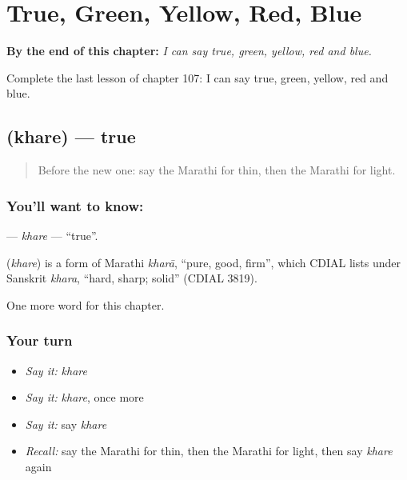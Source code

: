 
\chapter{True, Green, Yellow, Red, Blue}
\label{ch:mr-true-green-yellow-red-blue}

\begin{chapteropening}
\textbf{By the end of this chapter:} \emph{I can say true, green, yellow, red and blue.}

Complete the last lesson of chapter 107: I can say true, green, yellow, red and blue.
\end{chapteropening}

\section[\texorpdfstring{\mr{खरे} (khare)}{खरे (khare)}]{ (khare) — true}

\label{lesson:MR-C107-khare}



\begin{quote}
Before the new one: say the Marathi for thin, then the Marathi for light.
\end{quote}

\subsection*{You'll want to know: }
\textbf{} — \emph{khare} — \textquotedblleft{}true\textquotedblright{}.

\begin{cousinweb}
\textbf{} (\emph{khare}) is a form of Marathi \emph{kharā}, \textquotedblleft{}pure, good, firm\textquotedblright{}, which CDIAL lists under Sanskrit \emph{khara}, \textquotedblleft{}hard, sharp; solid\textquotedblright{} (CDIAL 3819).
\end{cousinweb}

\begin{grammarlens}[title={What you've built}]
One more word for this chapter.
\end{grammarlens}

\subsection*{Your turn}
\begin{itemize}
\raggedright
  \item \emph{Say it:} \emph{khare}
  \item \emph{Say it:} \emph{khare}, once more
  \item \emph{Say it:} say \emph{khare}
  \item \emph{Recall:} say the Marathi for thin, then the Marathi for light, then say \emph{khare} again
\end{itemize}

